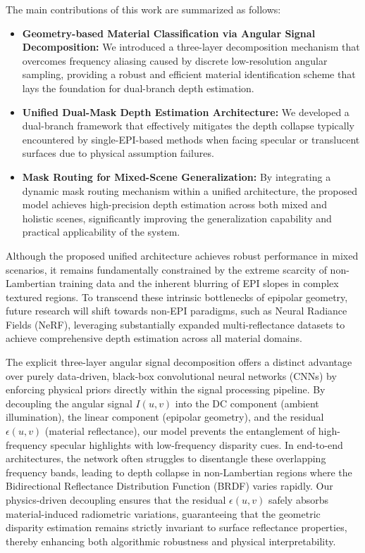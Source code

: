 \documentclass[lettersize,journal]{IEEEtran}
\begin{document}
The main contributions of this work are summarized as follows:
\begin{itemize}
    \item \textbf{Geometry-based Material Classification via Angular Signal Decomposition:} We introduced a three-layer decomposition mechanism that overcomes frequency aliasing caused by discrete low-resolution angular sampling, providing a robust and efficient material identification scheme that lays the foundation for dual-branch depth estimation.
    \item \textbf{Unified Dual-Mask Depth Estimation Architecture:} We developed a dual-branch framework that effectively mitigates the depth collapse typically encountered by single-EPI-based methods when facing specular or translucent surfaces due to physical assumption failures.
    \item \textbf{Mask Routing for Mixed-Scene Generalization:} By integrating a dynamic mask routing mechanism within a unified architecture, the proposed model achieves high-precision depth estimation across both mixed and holistic scenes, significantly improving the generalization capability and practical applicability of the system.
\end{itemize}

Although the proposed unified architecture achieves robust performance in mixed scenarios, it remains fundamentally constrained by the extreme scarcity of non-Lambertian training data and the inherent blurring of EPI slopes in complex textured regions. To transcend these intrinsic bottlenecks of epipolar geometry, future research will shift towards non-EPI paradigms, such as Neural Radiance Fields (NeRF), leveraging substantially expanded multi-reflectance datasets to achieve comprehensive depth estimation across all material domains.

The explicit three-layer angular signal decomposition offers a distinct advantage over purely data-driven, black-box convolutional neural networks (CNNs) by enforcing physical priors directly within the signal processing pipeline. By decoupling the angular signal $I(u,v)$ into the DC component (ambient illumination), the linear component (epipolar geometry), and the residual $\epsilon(u,v)$ (material reflectance), our model prevents the entanglement of high-frequency specular highlights with low-frequency disparity cues. In end-to-end architectures, the network often struggles to disentangle these overlapping frequency bands, leading to depth collapse in non-Lambertian regions where the Bidirectional Reflectance Distribution Function (BRDF) varies rapidly. Our physics-driven decoupling ensures that the residual $\epsilon(u,v)$ safely absorbs material-induced radiometric variations, guaranteeing that the geometric disparity estimation remains strictly invariant to surface reflectance properties, thereby enhancing both algorithmic robustness and physical interpretability.
\end{document}
